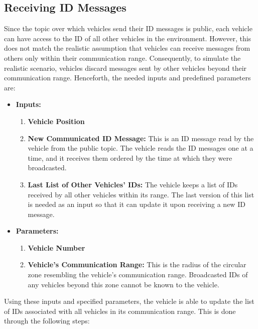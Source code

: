 \subsection{Receiving ID Messages}
\label{method_comm_rec}
Since the topic over which vehicles send their ID messages is public, each vehicle can have access to the ID of all other vehicles in the environment. However, this does not match the realistic assumption that vehicles can receive messages from others only within their communication range. Consequently, to simulate the realistic scenario, vehicles discard messages sent by other vehicles beyond their communication range. Henceforth, the needed inputs and predefined parameters are:

\begin{itemize}
    \item \textbf{Inputs:}
         \begin{enumerate}
             \item \textbf{Vehicle Position}
             \item \textbf{New Communicated ID Message:} This is an ID message read by the vehicle from the public topic. The vehicle reads the ID messages one at a time, and it receives them ordered by the time at which they were broadcasted.
             \item \textbf{Last List of Other Vehicles’ IDs:} The vehicle keeps a list of IDs received by all other vehicles within its range. The last version of this list is needed as an input so that it can update it upon receiving a new ID message.
         \end{enumerate}
    \item \textbf{Parameters:}
         \begin{enumerate}
             \item \textbf{Vehicle Number}
             \item \textbf{Vehicle’s Communication Range:} This is the radius of the circular zone resembling the vehicle’s communication range. Broadcasted IDs of any vehicles beyond this zone cannot be known to the vehicle.
         \end{enumerate}
\end{itemize}

Using these inputs and specified parameters, the vehicle is able to update the list of IDs associated with all vehicles in its communication range. This is done through the following steps:

